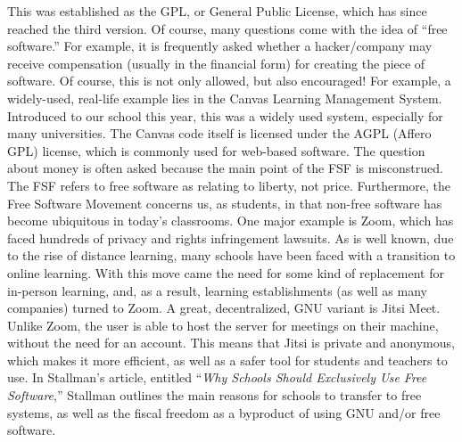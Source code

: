 \documentclass[12pt]{article}
\begin{document}
\begin{multicols}{3}
  This was established as the GPL, or General Public License, which has since reached the third version. Of course, many questions come with the idea of “free software.” For example, it is frequently asked whether a hacker/company may receive compensation (usually in the financial form) for creating the piece of software. Of course, this is not only allowed, but also encouraged! For example, a widely-used, real-life example lies in the Canvas Learning Management System. Introduced to our school this year, this was a widely used system, especially for many universities. The Canvas code itself is licensed under the AGPL (Affero GPL) license, which is commonly used for web-based software. The question about money is often asked because the main point of the FSF is misconstrued. The FSF refers to free software as relating to liberty, not price. Furthermore, the Free Software Movement concerns us, as students, in that non-free software has become ubiquitous in today's classrooms. One major example is Zoom, which has faced hundreds of privacy and rights infringement lawsuits. As is well known, due to the rise of distance learning, many schools have been faced with a transition to online learning. With this move came the need for some kind of replacement for in-person learning, and, as a result, learning establishments (as well as many companies) turned to Zoom. A great, decentralized, GNU variant is Jitsi Meet. Unlike Zoom, the user is able to host the server for meetings on their machine, without the need for an account. This means that Jitsi is private and anonymous, which makes it more efficient, as well as a safer tool for students and teachers to use. In Stallman's article, entitled “\textit{Why Schools Should Exclusively Use Free Software},” Stallman outlines the main reasons for schools to transfer to free systems, as well as the fiscal freedom as a byproduct of using GNU and/or free software. 

  \vfill


\end{multicols}
\end{document}
